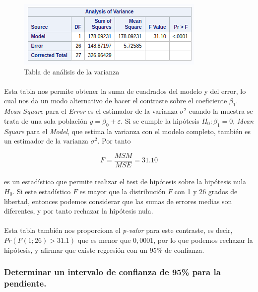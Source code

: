 \documentclass{article}
\begin{document}
  \begin{figure}[H]
    \centering
    \includegraphics[width=.5\linewidth]{img/montgomery/anovatable.png}
    \caption{Tabla de análisis de la varianza}
    \label{img:mont-anova}
  \end{figure}

  \paragraph{}
  Esta tabla nos permite obtener la suma de cuadrados del modelo y del error, lo cual nos da un modo alternativo de hacer el contraste sobre el coeficiente $\beta_1$. \textit{Mean Square} para el \textit{Error} es el estimador de la varianza $\sigma^2$ cuando la muestra se trata de una sola población $y=\beta_0 +\varepsilon$. Si se cumple la hipótesis $H_0: \beta_1=0$, \textit{Mean Square} para el \textit{Model}, que estima la varianza con el modelo completo, también es un estimador de la varianza $\sigma^2$. Por tanto

  \begin{equation}
    F = \frac{MSM}{MSE} = 31.10
  \end{equation}

  \paragraph{}
  es un estadístico que permite realizar el test de hipótesis sobre la hipótesis nula $H_0$. Si este estadístico $F$ es mayor que la distribución $F$ con 1 y 26 grados de libertad, entonces podemos considerar que las sumas de errores medias son diferentes, y por tanto rechazar la hipótesis nula.

  \paragraph{}
  Esta tabla también nos proporciona el \textit{p-valor} para este contraste, es decir, $Pr(F(1;26)>31.1)$ que es menor que $0,0001$, por lo que podemos rechazar la hipótesis, y afirmar que existe regresión con un 95\% de confianza.

  \subsubsection{Determinar un intervalo de confianza de 95\% para la pendiente.}
\end{document}
